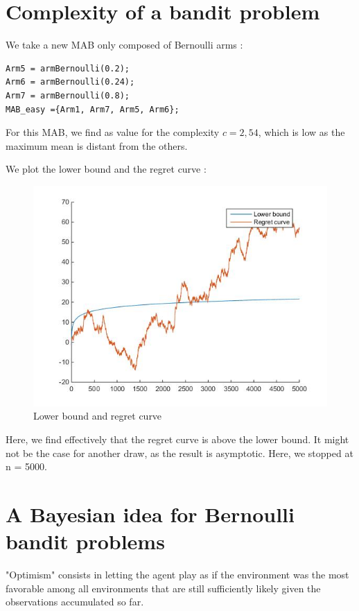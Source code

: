 \documentclass[11pt,a4paper]{article}
\begin{document}
\section{Complexity of a bandit problem}

We take a new MAB only composed of Bernoulli arms :
\begin{verbatim}
Arm5 = armBernoulli(0.2);
Arm6 = armBernoulli(0.24);
Arm7 = armBernoulli(0.8);
MAB_easy ={Arm1, Arm7, Arm5, Arm6};
\end{verbatim}

For this MAB, we find as value for the complexity $c = 2,54$, which is low as the maximum mean is distant from the others.

We plot the lower bound and the regret curve :
\begin{figure}[H]
	\centering
	\noindent\includegraphics[scale=0.4]{complexity.jpg}
	\caption{Lower bound and regret curve}
\end{figure}

Here, we find effectively that the regret curve is above the lower bound. It might not be the case for another draw, as the result is asymptotic. Here, we stopped at n = 5000.

\section{A Bayesian idea for Bernoulli bandit problems}

"Optimism" consists in letting the agent play as if the environment was the most favorable among all environments that are still sufficiently likely given the observations accumulated so far.
\end{document}
